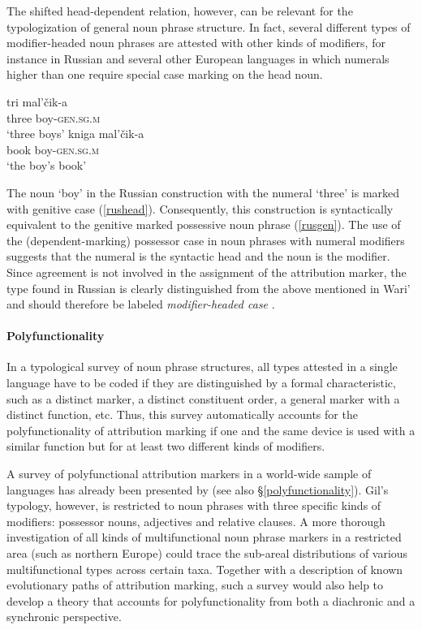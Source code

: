 The shifted head-dependent relation, however, can be relevant for the typologization of general noun phrase structure. In fact, several different types of modifier\hyp{}headed noun phrases are attested with other kinds of modifiers, for instance in Russian and several other European languages in which numerals higher than one require special case marking on the head noun.
\begin{exe}
\ex
\label{russianheadstand}
\begin{xlist}
\ex
\label{rushead}
\gll tri mal'čik-a\\
  	three		boy-\textsc{gen.sg.m}\\
  \glt ‘three boys’
\ex
\label{rusgen}
  \gll	kniga mal'čik-a\\
  	book	 boy-\textsc{gen.sg.m}\\
  \trans ‘the boy's book’
\end{xlist}
\end{exe}
The noun ‘boy’ in the Russian construction with the numeral ‘three’ is marked with genitive case (\ref{rushead}). Consequently, this construction is syntactically equivalent to the genitive marked possessive noun phrase (\ref{rusgen}). The use of the (dependent\hyp{}marking) possessor case in noun phrases with numeral modifiers suggests that the numeral is the syntactic head and the noun is the modifier. Since agreement is not involved in the assignment of the attribution marker, the type found in Russian is clearly distinguished from the above mentioned  in Wari' and should therefore be labeled \textit{modifier\hyp{}headed case} \citep[cf.][]{AUTOTYP-NP}.

\paragraph*{Polyfunctionality} 
In a typological survey of noun phrase structures, all types attested in a single language have to be coded if they are distinguished by a formal characteristic, such as a distinct marker, a distinct constituent order, a general marker with a distinct function, etc. Thus, this survey automatically accounts for the polyfunctionality of attribution marking if one and the same device is used with a similar function but for at least two different kinds of modifiers.

A survey of polyfunctional attribution markers in a world-wide sample of languages has already been presented by \citet{gil2005} (see also \S\ref{polyfunctionality}). Gil's typology, however, is restricted to noun phrases with three specific kinds of modifiers: possessor nouns, adjectives and relative clauses. A more thorough investigation of all kinds of multifunctional noun phrase markers in a restricted area (such as northern Europe) could trace the sub-areal distributions of various multifunctional types across certain taxa. Together with a description of known evolutionary paths of attribution marking, such a survey would also help to develop a theory that accounts for polyfunctionality from both a diachronic and a synchronic perspective.
